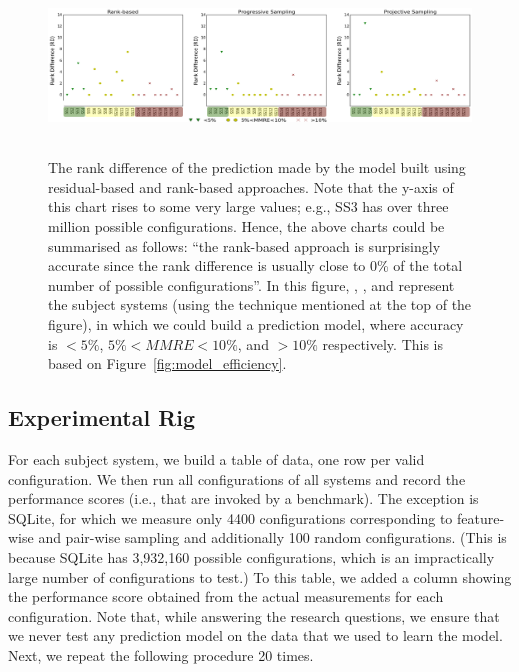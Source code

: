 \begin{figure}[tbh]
\centering
\includegraphics[width=0.8\paperwidth, height=4.7cm]{Chapter-Rank/figures/figure4_2_mod.png}
\caption[The rank difference of the prediction made by the model built using residual-based and rank-based approaches.]{
    \small{The rank difference of the prediction made by the model built using residual-based and rank-based approaches. Note that the y-axis of this chart rises to some very large values; e.g., SS3 has over three million
    possible configurations. Hence, the above charts could be summarised as follows: ``the rank-based approach is surprisingly accurate since the rank difference is usually close to 0\% of the total number of possible configurations''. In this figure, \protect\custriangle{}, \protect\cusdot{}, and \protect\cuscross{} represent the subject systems (using the technique mentioned at the top of the figure), in which we could build a prediction model, where accuracy is  $< 5\%$, $5\%<MMRE<10\%$, and $>10\%$ respectively. This is based on Figure~\ref{fig:model_efficiency}.
    }
}\label{fig:rankdiff}
\end{figure}



\subsection{Experimental Rig}
For each subject system, we build a table of data, one row per valid configuration. We then run all configurations of all systems and record the performance scores (i.e., that are invoked by a benchmark). The exception is SQLite, for which we measure only 4400 configurations corresponding to feature-wise and pair-wise sampling and additionally 100 random configurations. (This is because SQLite has 3,932,160 possible configurations,
which is an impractically large number of configurations to test.) To this table, we added a column showing the performance score obtained from the actual measurements for each configuration. Note that, while answering the research questions, we ensure that we never test any prediction model on the data that we used to learn the model. Next, we repeat the following procedure 20 times. 

